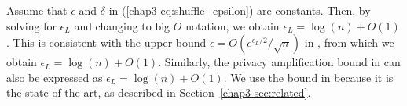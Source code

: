 Assume that $\epsilon$ and $\delta$ in (\ref{chap3-eq:shuffle_epsilon}) are constants. 
Then, by solving for $\epsilon_L$ and changing to big $O$ notation, we obtain  $\epsilon_L = \log(n) + O(1)$. 
This is consistent with the upper bound $\epsilon = O(e^{\epsilon_L / 2} / \sqrt{n})$ in \cite{Feldman_FOCS21}, from which we obtain $\epsilon_L = \log(n) + O(1)$. 
Similarly, the privacy amplification bound in \cite{Cheu_EUROCRYPT19} can also be expressed as $\epsilon_L = \log(n) + O(1)$. 
We use the bound in \cite{Feldman_FOCS21} because it is the state-of-the-art, as described in Section~\ref{chap3-sec:related}. 


